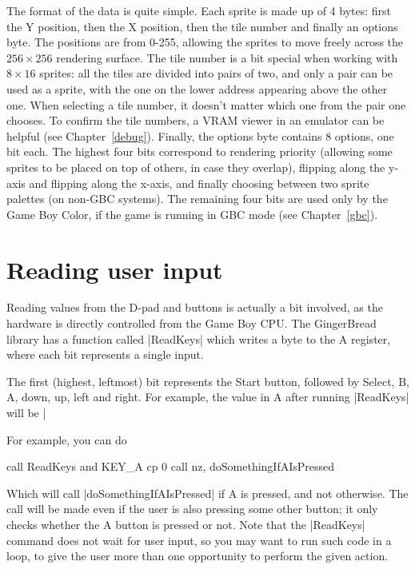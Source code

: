 \documentclass[11pt]{book}
\begin{document}
The format of the data is quite simple. Each sprite is made up of 4 bytes: first the Y position, then the X position, then the tile number and finally an options byte. The positions are from 0-255, allowing the sprites to move freely across the $256\times256$ rendering surface. The tile number is a bit special when working with $8\times16$ sprites: all the tiles are divided into pairs of two, and only a pair can be used as a sprite, with the one on the lower address appearing above the other one. When selecting a tile number, it doesn't matter which one from the pair one chooses. To confirm the tile numbers, a VRAM viewer in an emulator can be helpful (see Chapter~\ref{debug}). Finally, the options byte contains 8 options, one bit each. The highest four bits correspond to rendering priority (allowing some sprites to be placed on top of others, in case they overlap), flipping along the y-axis and flipping along the x-axis, and finally choosing between two sprite palettes (on non-GBC systems). The remaining four bits are used only by the Game Boy Color, if the game is running in GBC mode (see Chapter~\ref{gbc}).

\section{Reading user input}
\label{userinput}
Reading values from the D-pad and buttons is actually a bit involved, as the hardware is directly controlled from the Game Boy CPU. The GingerBread library has a function called |ReadKeys| which writes a byte to the A register, where each bit represents a single input.

The first (highest, leftmost) bit represents the Start button, followed by Select, B, A, down, up, left and right. For example, the value in A after running |ReadKeys| will be |%

For example, you can do 

\begin{code}
call ReadKeys
and KEY_A
cp 0
call nz, doSomethingIfAIsPressed
\end{code}

Which will call |doSomethingIfAIsPressed| if A is pressed, and not otherwise. The call will be made even if the user is also pressing some other button; it only checks whether the A button is pressed or not. Note that the |ReadKeys| command does not wait for user input, so you may want to run such code in a loop, to give the user more than one opportunity to perform the given action. 
\end{document}
